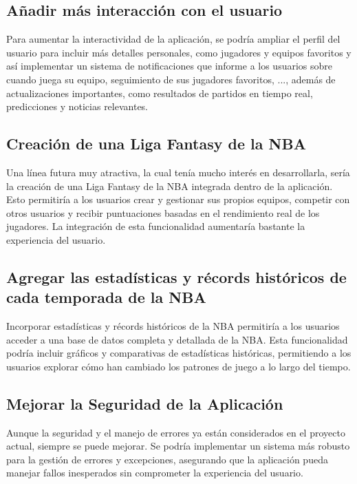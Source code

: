 \subsection{Añadir más interacción con el usuario}
Para aumentar la interactividad de la aplicación, se podría ampliar el perfil del usuario para incluir más detalles personales, como jugadores y equipos favoritos y así implementar un sistema de notificaciones que informe a los usuarios sobre cuando juega su equipo, seguimiento de sus jugadores favoritos, ..., además de actualizaciones importantes, como resultados de partidos en tiempo real, predicciones y noticias relevantes.

\subsection{Creación de una Liga Fantasy de la NBA}
Una línea futura muy atractiva, la cual tenía mucho interés en desarrollarla, sería la creación de una Liga Fantasy de la NBA integrada dentro de la aplicación. Esto permitiría a los usuarios crear y gestionar sus propios equipos, competir con otros usuarios y recibir puntuaciones basadas en el rendimiento real de los jugadores. La integración de esta funcionalidad aumentaría bastante la experiencia del usuario.

\subsection{Agregar las estadísticas y récords históricos de cada temporada de la NBA}
Incorporar estadísticas y récords históricos de la NBA permitiría a los usuarios acceder a una base de datos completa y detallada de la NBA. Esta funcionalidad podría incluir gráficos y comparativas de estadísticas históricas, permitiendo a los usuarios explorar cómo han cambiado los patrones de juego a lo largo del tiempo.

\subsection{Mejorar la Seguridad de la Aplicación}
Aunque la seguridad y el manejo de errores ya están considerados en el proyecto actual, siempre se puede mejorar. Se podría implementar un sistema más robusto para la gestión de errores y excepciones, asegurando que la aplicación pueda manejar fallos inesperados sin comprometer la experiencia del usuario.
